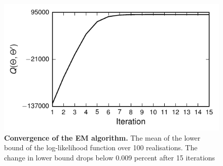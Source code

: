 \documentclass[]{article}
\begin{document}
\begin{figure}[!ht]
\begin{center}
\includegraphics{./Figures/Q.pdf}
\end{center}
\caption{{\bf Convergence of the EM algorithm.} The mean of the lower bound of the log-likelihood function over 100 realisations. The change in lower bound drops below 0.009 percent after 15 iterations}
\label{fig:LowerBound}
\end{figure}
\end{document}
